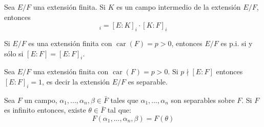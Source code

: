 \documentclass[12pt]{report}
\theoremstyle{largebreak}
\DeclareMathOperator{\car}{car}
\begin{document}
    \begin{obs}
        Sea $E/F$ una extensión finita. Si $K$ es un campo intermedio de la extensión $E/F$, entonces
        \begin{equation*}
            [E:F]_i=[E:K]_i\cdot[K:F]_i
        \end{equation*}
        
        Si $E/F$ es una extensión finita con $\car(F)=p>0$, entonces $E/F$ es p.i. si y sólo si $[E:F]=[E:F]_i$.
    \end{obs}

    \begin{obs}
        Sea $E/F$ una extensión finita con $\car(F)=p>0$. Si $p\nmid [E:F]$ entonces $[E:F]_i=1$, es decir la extensión $E/F$ es separable.
    \end{obs}

    \begin{propo}
        Sea $F$ un campo, $\alpha_1,...,\alpha_n,\beta\in\bar{F}$ tales que $\alpha_1,...,\alpha_n$ son separables sobre $F$. Si $F$ es infinito entonces, existe $\theta\in\bar{F}$ tal que:
        \begin{equation*}
            F(\alpha_1,...,\alpha_n,\beta)=F(\theta)
        \end{equation*}
    \end{propo}
\end{document}
